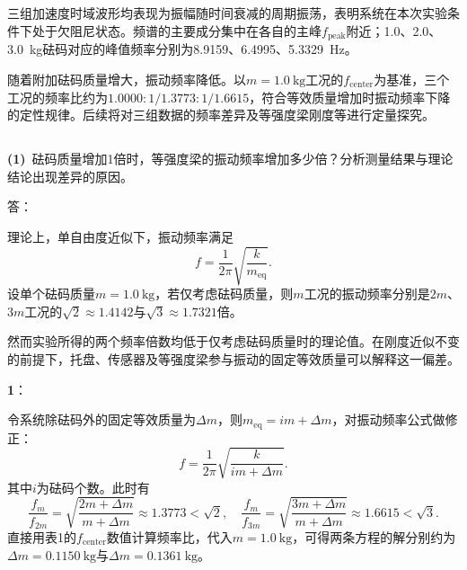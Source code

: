 \documentclass[12pt, oneside, a4paper]{ctexart}
\begin{document}
\subsection{}
\par{}
三组加速度时域波形均表现为振幅随时间衰减的周期振荡，表明系统在本次实验条件下处于欠阻尼状态。频谱的主要成分集中在各自的主峰$f_\mathrm{peak}$附近；1.0、2.0、3.0~kg砝码对应的峰值频率分别为8.9159、6.4995、5.3329~Hz。
\par{}
随着附加砝码质量增大，振动频率降低。以$m=1.0~\mathrm{kg}$工况的$f_\mathrm{center}$为基准，三个工况的频率比约为$1.0000:1/1.3773:1/1.6615$，符合等效质量增加时振动频率下降的定性规律。后续将对三组数据的频率差异及等强度梁刚度等进行定量探究。

\subsection{}
\par\noindent{}
\textbf{(1)}{\heiti~砝码质量增加1倍时，等强度梁的振动频率增加多少倍？分析测量结果与理论结论出现差异的原因。}
\par{}
{\setlength{\parindent}{0pt}\heiti{}答：}
\par{}
理论上，单自由度近似下，振动频率满足
\begin{equation*}
    f = \frac{1}{2 \pi} \sqrt{\frac{k}{m_{\mathrm{eq}}}}.
\end{equation*}
设单个砝码质量$m = 1.0~\mathrm{kg}$，若仅考虑砝码质量，则$m$工况的振动频率分别是$2m$、$3m$工况的$\sqrt{2} \approx 1.4142$与$\sqrt{3} \approx 1.7321$倍。
\par{}
然而实验所得的两个频率倍数均低于仅考虑砝码质量时的理论值。在刚度近似不变的前提下，托盘、传感器及等强度梁参与振动的固定等效质量可以解释这一偏差。
\par{}
{\textbf{1}{\heiti{}：}}
\par{}
令系统除砝码外的固定等效质量为$\Delta m$，则$m_{\mathrm{eq}} = i m + \Delta m$，对振动频率公式做修正：
\begin{equation*}
    f = \frac{1}{2 \pi} \sqrt{\frac{k}{i m + \Delta m}}.
\end{equation*}
其中$i$为砝码个数。此时有
\begin{equation*}
    \frac{f_m}{f_{2m}}=\sqrt{\frac{2m + \Delta m}{m + \Delta m}} \approx 1.3773 < \sqrt{2}, \quad \frac{f_m}{f_{3m}}=\sqrt{\frac{3m + \Delta m}{m + \Delta m}} \approx 1.6615 < \sqrt{3}.
\end{equation*}
直接用表1的$f_\mathrm{center}$数值计算频率比，代入$m = 1.0~\mathrm{kg}$，可得两条方程的解分别约为$\Delta m = 0.1150~\mathrm{kg}$与$\Delta m = 0.1361~\mathrm{kg}$。
\end{document}

